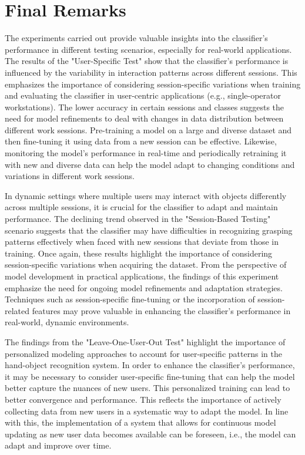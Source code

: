 \section{Final Remarks}
\label{section:learning_final_remarks}

The experiments carried out provide valuable insights into the classifier's performance in different testing scenarios, especially for real-world applications. The results of the "User-Specific Test" show that the classifier's performance is influenced by the variability in interaction patterns across different sessions. This emphasizes the importance of considering session-specific variations when training and evaluating the classifier in user-centric applications (e.g., single-operator workstations). The lower accuracy in certain sessions and classes suggests the need for model refinements to deal with changes in data distribution between different work sessions. Pre-training a model on a large and diverse dataset and then fine-tuning it using data from a new session can be effective. Likewise, monitoring the model's performance in real-time and periodically retraining it with new and diverse data can help the model adapt to changing conditions and variations in different work sessions.

In dynamic settings where multiple users may interact with objects differently across multiple sessions, it is crucial for the classifier to adapt and maintain performance. The declining trend observed in the "Session-Based Testing" scenario suggests that the classifier may have difficulties in recognizing grasping patterns effectively when faced with new sessions that deviate from those in training. Once again, these results highlight the importance of considering session-specific variations when acquiring the dataset. From the perspective of model development in practical applications, the findings of this experiment emphasize the need for ongoing model refinements and adaptation strategies. Techniques such as session-specific fine-tuning or the incorporation of session-related features may prove valuable in enhancing the classifier's performance in real-world, dynamic environments.

The findings from the "Leave-One-User-Out Test" highlight the importance of personalized modeling approaches to account for user-specific patterns in the hand-object recognition system. In order to enhance the classifier's performance, it may be necessary to consider user-specific fine-tuning that can help the model better capture the nuances of new users. This personalized training can lead to better convergence and performance. This reflects the importance of actively collecting data from new users in a systematic way to adapt the model. In line with this, the implementation of a system that allows for continuous model updating as new user data becomes available can be foreseen, i.e., the model can adapt and improve over time.

